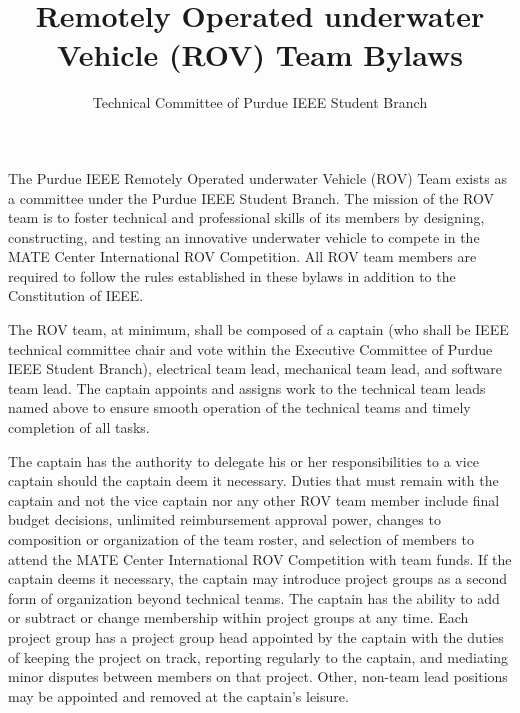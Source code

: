 \documentclass[12pt]{constitution}
\title{Remotely Operated underwater Vehicle (ROV) Team Bylaws}
\author{Technical Committee of Purdue IEEE Student Branch}
\date{}
\begin{document}

\titlecontentspage
\newpage


\label{art:preamble}

The Purdue IEEE Remotely Operated underwater Vehicle (ROV) Team exists as a committee under the Purdue IEEE Student Branch. The mission of the ROV team is to foster technical and professional skills of its members by designing, constructing, and testing an innovative underwater vehicle to compete in the MATE Center International ROV Competition. All ROV team members are required to follow the rules established in these bylaws in addition to the Constitution of IEEE.


\label{art:structmem}

The ROV team, at minimum, shall be composed of a captain (who shall be IEEE technical committee chair and vote within the Executive Committee of Purdue IEEE Student Branch), electrical team lead, mechanical team lead, and software team lead. The captain appoints and assigns work to the technical team leads named above to ensure smooth operation of the technical teams and timely completion of all tasks.

The captain has the authority to delegate his or her responsibilities to a vice captain should the captain deem it necessary. Duties that must remain with the captain and not the vice captain nor any other ROV team member include final budget decisions, unlimited reimbursement approval power, changes to composition or organization of the team roster, and selection of members to attend the MATE Center International ROV Competition with team funds. If the captain deems it necessary, the captain may introduce project groups as a second form of organization beyond technical teams. The captain has the ability to add or subtract or change membership within project groups at any time. Each project group has a project group head appointed by the captain with the duties of keeping the project on track, reporting regularly to the captain, and mediating minor disputes between members on that project. Other, non-team lead positions may be appointed and removed at the captain's leisure.
\end{document}
